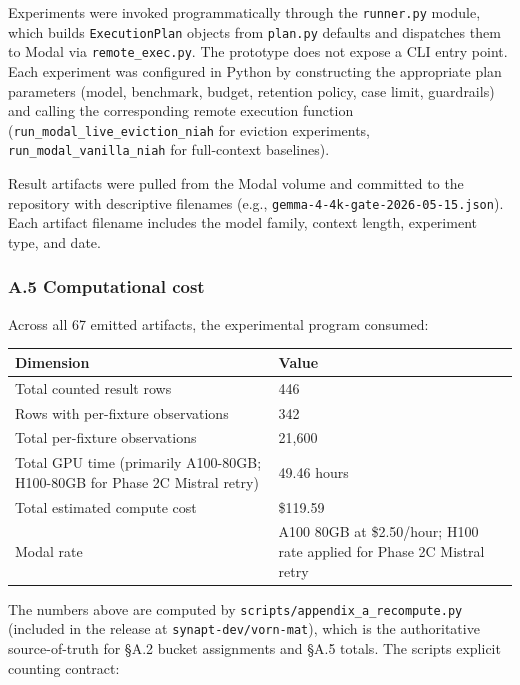 \documentclass[
]{article}
\newcounter{none} %
\begin{document}
Experiments were invoked programmatically through the \texttt{runner.py}
module, which builds \texttt{ExecutionPlan} objects from
\texttt{plan.py} defaults and dispatches them to Modal via
\texttt{remote\_exec.py}. The prototype does not expose a CLI entry
point. Each experiment was configured in Python by constructing the
appropriate plan parameters (model, benchmark, budget, retention policy,
case limit, guardrails) and calling the corresponding remote execution
function (\texttt{run\_modal\_live\_eviction\_niah} for eviction
experiments, \texttt{run\_modal\_vanilla\_niah} for full-context
baselines).

Result artifacts were pulled from the Modal volume and committed to the
repository with descriptive filenames (e.g.,
\texttt{gemma-4-4k-gate-2026-05-15.\allowbreak{}json}). Each artifact filename
includes the model family, context length, experiment type, and date.

\subsubsection{A.5 Computational cost}\label{a5-computational-cost}

Across all 67 emitted artifacts, the experimental program consumed:

{\def\LTcaptype{none} %
{\scriptsize\setlength{\tabcolsep}{2pt}\renewcommand{\arraystretch}{0.92} \begin{longtable}[]{@{}p{4.5cm}p{6.5cm}@{}}
\toprule\noalign{}
Dimension & Value \\
\midrule\noalign{}
\endhead
\bottomrule\noalign{}
\endlastfoot
Total counted result rows & 446 \\
Rows with per-fixture observations & 342 \\
Total per-fixture observations & 21,600 \\
Total GPU time (primarily A100-80GB; H100-80GB for Phase 2C Mistral
retry) & 49.46 hours \\
Total estimated compute cost & \$119.59 \\
Modal rate & A100 80GB at \$2.50/hour; H100 rate applied for Phase 2C
Mistral retry \\
\end{longtable}}
}

The numbers above are computed by
\texttt{scripts/\allowbreak{}appendix\_a\_recompute.\allowbreak{}py} (included in the release at
\texttt{synapt-dev/vorn-mat}), which is the authoritative
source-of-truth for §A.2 bucket assignments and §A.5 totals. The
script\textquotesingle s explicit counting contract:
\end{document}
